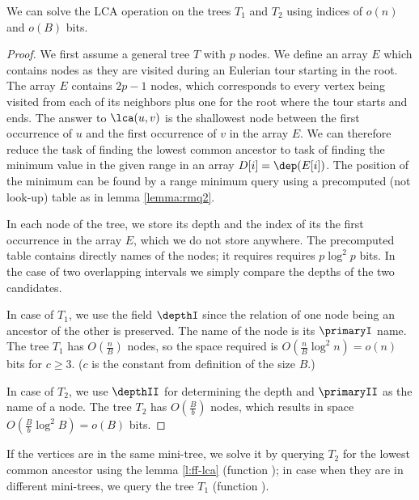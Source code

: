 \begin{lemma}\label{l:ff-lca}
	We can solve the LCA operation on the trees $T_1$ and $T_2$ using indices of $o(n)$ and $o(B)$ bits.
\end{lemma}
\begin{proof}
	We first assume a general tree $T$ with $p$ nodes.
	We define an array $E$ which contains nodes as they are visited during an Eulerian tour starting in the root.
	The array $E$ contains $2p - 1$ nodes, which corresponds to every vertex being visited from each of its neighbors plus one for the root where the tour starts and ends.
	The answer to $\lca(u, v)$ is the shallowest node between the first occurrence of $u$ and the first occurrence of $v$ in the array $E$.
	We can therefore reduce the task of finding the lowest common ancestor to task of finding the minimum value in the given range in an array $D[i] = \dep(E[i])$.
	The position of the minimum can be found by a range minimum query using a precomputed (not look-up) table as in lemma \ref{lemma:rmq2}.
	
	In each node of the tree, we store its depth and the index of its the first occurrence in the array $E$, which we do not store anywhere.
	The precomputed table contains directly names of the nodes; it requires requires $p \log^2 p$ bits.
	In the case of two overlapping intervals we simply compare the depths of the two candidates.
	
	In case of $T_1$, we use the field $\depthI$ since the relation of one node being an ancestor of the other is preserved.
	The name of the node is its $\primaryI$ name.
	The tree $T_1$ has $O\left(\frac{n}{B}\right)$ nodes, so the space required is $O\left(\frac{n}{B} \log^2 n\right) = o(n)$ bits for $c \ge 3$.
	($c$ is the constant from definition of the size $B$.)
	
	In case of $T_2$, we use $\depthII$ for determining the depth and $\primaryII$ as the name of a node.
	The tree $T_2$ has $O\left(\frac{B}{b}\right)$ nodes, which results in space $O\left(\frac{B}{b} \log^2 B\right) = o(B)$ bits.
\end{proof}

If the vertices are in the same mini-tree, we solve it by querying $T_2$ for the lowest common ancestor using the lemma \ref{l:ff-lca} (function \lcaI); in case when they are in different mini-trees, we query the tree $T_1$ (function \lcaII).

